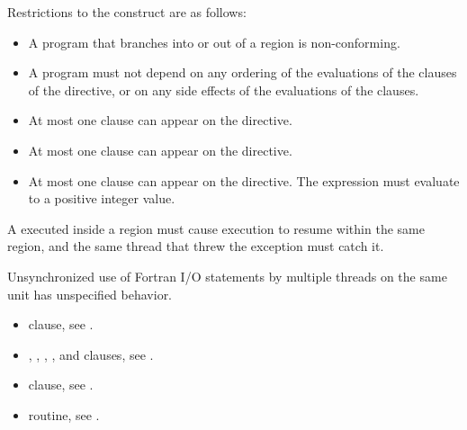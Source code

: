 \restrictions
Restrictions to the  construct are as follows:

\begin{itemize}
\item A program that branches into or out of a  region is non-conforming.

\item A program must not depend on any ordering of the evaluations of the clauses of the 
 directive, or on any side effects of the evaluations of the clauses.

\item At most one  clause can appear on the directive.

\item At most one  clause can appear on the directive.

\item At most one  clause can appear on the directive. The  
expression must evaluate to a positive integer value.
\end{itemize}

\ccppspecificstart
A  executed inside a  region must cause execution to resume 
within the same  region, and the same thread that threw the exception 
must catch it.
\ccppspecificend

\fortranspecificstart
Unsynchronized use of Fortran I/O statements by multiple threads on the same unit 
has unspecified behavior.
\fortranspecificend

\crossreferences
\begin{itemize}
\item {} clause, see .

\item {}, , , , and  clauses, see 
.

\item {} clause, see 
.

\item {} routine, see 
.
\end{itemize}











